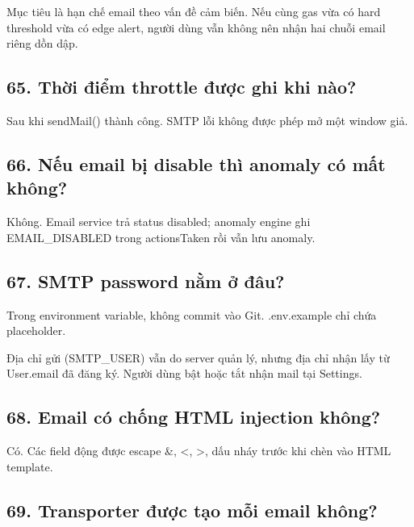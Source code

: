 \documentclass[11pt,oneside,openany]{book}
\renewcommand{\texttt}[1]{{\ttfamily\small #1}}
\begin{document}
Mục tiêu là hạn chế email theo vấn đề cảm biến. Nếu cùng gas vừa có hard
threshold vừa có edge alert, người dùng vẫn không nên nhận hai chuỗi
email riêng dồn dập.

\subsection{65. Thời điểm throttle được ghi khi
nào?}\label{65-thux1eddi-ux111iux1ec3m-throttle-ux111ux1b0ux1ee3c-ghi-khi-nuxe0o}

Sau khi \texttt{sendMail()} thành công. SMTP lỗi không được phép mở một
window giả.

\subsection{66. Nếu email bị disable thì anomaly có mất
không?}\label{66-nux1ebfu-email-bux1ecb-disable-thuxec-anomaly-cuxf3-mux1ea5t-khuxf4ng}

Không. Email service trả status \texttt{disabled}; anomaly engine ghi
\texttt{EMAIL\_DISABLED} trong actionsTaken rồi vẫn lưu anomaly.

\subsection{67. SMTP password nằm ở
đâu?}\label{67-smtp-password-nux1eb1m-ux1edf-ux111uxe2u}

Trong environment variable, không commit vào Git. \texttt{.env.example}
chỉ chứa placeholder.

Địa chỉ gửi (\texttt{SMTP\_USER}) vẫn do server quản lý, nhưng địa chỉ
nhận lấy từ \texttt{User.email} đã đăng ký. Người dùng bật hoặc tắt nhận
mail tại Settings.

\subsection{68. Email có chống HTML injection
không?}\label{68-email-cuxf3-chux1ed1ng-html-injection-khuxf4ng}

Có. Các field động được escape \texttt{\&}, \texttt{\textless{}},
\texttt{\textgreater{}}, dấu nháy trước khi chèn vào HTML template.

\subsection{69. Transporter được tạo mỗi email
không?}\label{69-transporter-ux111ux1b0ux1ee3c-tux1ea1o-mux1ed7i-email-khuxf4ng}
\end{document}
